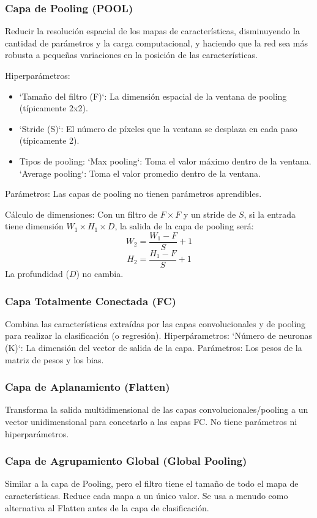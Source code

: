 \documentclass{article}
\begin{document}
\subsubsection{Capa de Pooling (POOL)}

Reducir la resolución espacial de los mapas de características, disminuyendo la cantidad de parámetros y la carga computacional, y haciendo que la red sea más robusta a pequeñas variaciones en la posición de las características.

Hiperparámetros:
\begin{itemize}
\item `Tamaño del filtro (F)`:  La dimensión espacial de la ventana de pooling (típicamente 2x2).
\item `Stride (S)`:  El número de píxeles que la ventana se desplaza en cada paso (típicamente 2).
\item Tipos de pooling:
    `Max pooling`:  Toma el valor máximo dentro de la ventana.
    `Average pooling`:  Toma el valor promedio dentro de la ventana.
\end{itemize}

Parámetros:  Las capas de pooling no tienen parámetros aprendibles.

Cálculo de dimensiones: Con un filtro de \(F \times F\) y un stride de \(S\), si la entrada tiene dimensión \(W_1 \times H_1 \times D\), la salida de la capa de pooling será:
 \[
    W_2 = \frac{W_1 - F}{S} + 1
    \]
    \[
    H_2 = \frac{H_1 - F}{S} + 1
    \]
    La profundidad (\(D\)) no cambia.

\subsubsection{Capa Totalmente Conectada (FC)}

Combina las características extraídas por las capas convolucionales y de pooling para realizar la clasificación (o regresión).
Hiperpárametros: `Número de neuronas (K)`:  La dimensión del vector de salida de la capa.
Parámetros:  Los pesos de la matriz de pesos y los bias.

\subsubsection{Capa de Aplanamiento (Flatten)}
Transforma la salida multidimensional de las capas convolucionales/pooling a un vector unidimensional para conectarlo a las capas FC. No tiene parámetros ni hiperparámetros.

\subsubsection{Capa de Agrupamiento Global (Global Pooling)}
Similar a la capa de Pooling, pero el filtro tiene el tamaño de todo el mapa de características. Reduce cada mapa a un único valor. Se usa a menudo como alternativa al Flatten antes de la capa de clasificación.
\end{document}
